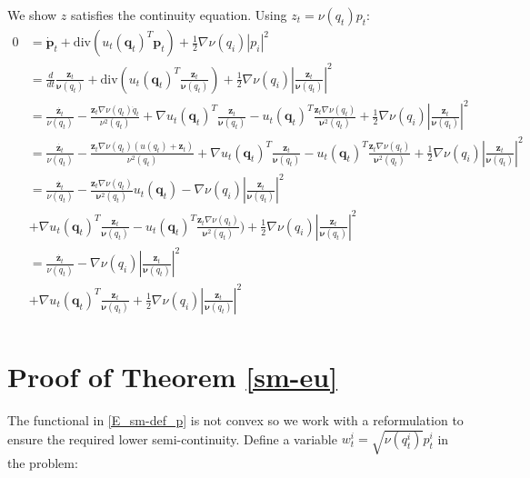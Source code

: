 \documentclass[runningheads]{llncs}
\newcommand{\mdiv}{\text{div}}
\begin{document}
We show $z$ satisfies the continuity equation. Using $z_t = \nu(q_t)p_t$:
\begin{align*} 0 & = \dot{\mathbf p}_t + \mdiv(u_t(\mathbf q_t)^T \mathbf p_t) +
\frac12\nabla\nu(q_i) |p_i|^2\\
& = \frac{d}{dt}\frac{\mathbf z_t}{\mathbf \nu(q_t)} + \mdiv(u_t(\mathbf q_t)^T \frac{\mathbf z_t}{\mathbf \nu(q_t)}) 
    +  \frac12\nabla\nu(q_i) |\frac{\mathbf z_t}{\mathbf \nu(q_t)}|^2\\
& = \frac{\dot{\mathbf z_t}}{\nu(q_t)} - \frac{\mathbf z_t \nabla\nu(q_t)\dot{q}_t}{\nu^2(q_t)} + 
\nabla u_t(\mathbf q_t)^T \frac{\mathbf z_t}{\mathbf \nu(q_t)}
- u_t(\mathbf q_t)^T \frac{\mathbf z_t\nabla \nu(q_t)}{\mathbf \nu^2(q_t)}
    + \frac12\nabla\nu(q_i) |\frac{\mathbf z_t}{\mathbf \nu(q_t)}|^2\\
& = \frac{\dot{\mathbf z_t}}{\nu(q_t)} - \frac{\mathbf z_t \nabla\nu(q_t)(u(q_t)+ \mathbf z_t)}{\nu^2(q_t)} + 
\nabla u_t(\mathbf q_t)^T \frac{\mathbf z_t}{\mathbf \nu(q_t)}
- u_t(\mathbf q_t)^T \frac{\mathbf z_t\nabla \nu(q_t)}{\mathbf \nu^2(q_t)}
    + \frac12\nabla\nu(q_i) |\frac{\mathbf z_t}{\mathbf \nu(q_t)}|^2\\
& = \frac{\dot{\mathbf z_t}}{\nu(q_t)} - \frac{\mathbf z_t\nabla \nu(q_t)}{\mathbf \nu^2(q_t)}u_t(\mathbf q_t)
 - \nabla\nu(q_i) |\frac{\mathbf z_t}{\mathbf \nu(q_t)}|^2\\
&+  \nabla u_t(\mathbf q_t)^T \frac{\mathbf z_t}{\mathbf \nu(q_t)}
- u_t(\mathbf q_t)^T \frac{\mathbf z_t\nabla \nu(q_t)}{\mathbf \nu^2(q_t)})
    + \frac12\nabla\nu(q_i) |\frac{\mathbf z_t}{\mathbf \nu(q_t)}|^2\\
& = \frac{\dot{\mathbf z_t}}{\nu(q_t)}
 - \nabla\nu(q_i) |\frac{\mathbf z_t}{\mathbf \nu(q_t)}|^2\\
& + \nabla u_t(\mathbf q_t)^T \frac{\mathbf z_t}{\mathbf \nu(q_t)} + \frac12\nabla\nu(q_i) |\frac{\mathbf z_t}{\mathbf \nu(q_t)}|^2\\
\end{align*}
\fi

\section{Proof of Theorem \ref{sm-eu}}\label{app:proof:sm-eu}
The functional in \eqref{E_sm-def_p} is not convex so we work with a
reformulation to ensure the required lower semi-continuity. Define a
variable $w^i_t = \sqrt{\nu(q_t^i)} p^i_t$ in the problem:
\end{document}
